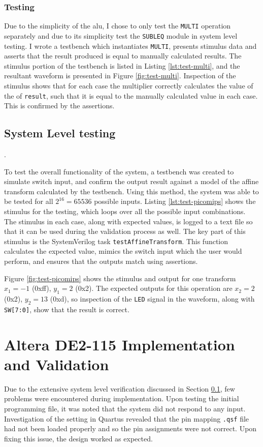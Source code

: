 \subsubsection{Testing}
Due to the simplicity of the \gls{alu}, I chose to only test the \texttt{MULTI} operation separately and due to its simplicity test the \texttt{SUBLEQ} module in system level testing. I wrote a testbench which instantiates \texttt{MULTI}, presents stimulus data and asserts that the result produced is equal to manually calculated results. The stimulus portion of the testbench is listed in Listing \ref{lst:test-multi}, and the resultant waveform is presented in Figure \ref{fig:test-multi}. Inspection of the stimulus shows that for each case the multiplier correctly calculates the value of the of \texttt{result}, such that it is equal to the manually calculated value in each case. This is confirmed by the assertions.

\subsection{System Level testing} \label{sec:sys-level-testing}.

To test the overall functionality of the system, a testbench was created to simulate switch input, and confirm the output result against a model of the affine transform calculated by the testbench. Using this method, the system was able to be tested for all $2^{16} = 65536$ possible inputs. Listing \ref{lst:test-picomips} shows the stimulus for the testing, which loops over all the possible input combinations. The stimulus in each case, along with expected values, is logged to a text file so that it can be used during the validation process as well. The key part of this stimulus is the SystemVerilog task \texttt{testAffineTransform}. This function calculates the expected value, mimics the switch input which the user would perform, and ensures that the outputs match using assertions.

Figure \ref{fig:test-picomips} shows the stimulus and output for one transform $x_1 = -1$ (0xff), $y_1 = 2$ (0x2). The expected outputs for this operation are $x_2 = 2$ (0x2), $y_2 = 13$ (0xd), so inspection of the \texttt{LED} signal in the waveform, along with \texttt{SW[7:0]}, show that the result is correct. 

\section{Altera DE2-115 Implementation and Validation} \label{sec:implementation}
Due to the extensive system level verification discussed in Section \ref{sec:sys-level-testing}, few problems were encountered during implementation. Upon testing the initial programming file, it was noted that the system did not respond to any input. Investigation of the setting in Quartus revealed that the pin mapping \texttt{.qsf} file had not been loaded properly and so the pin assignments were not correct. Upon fixing this issue, the design worked as expected.

